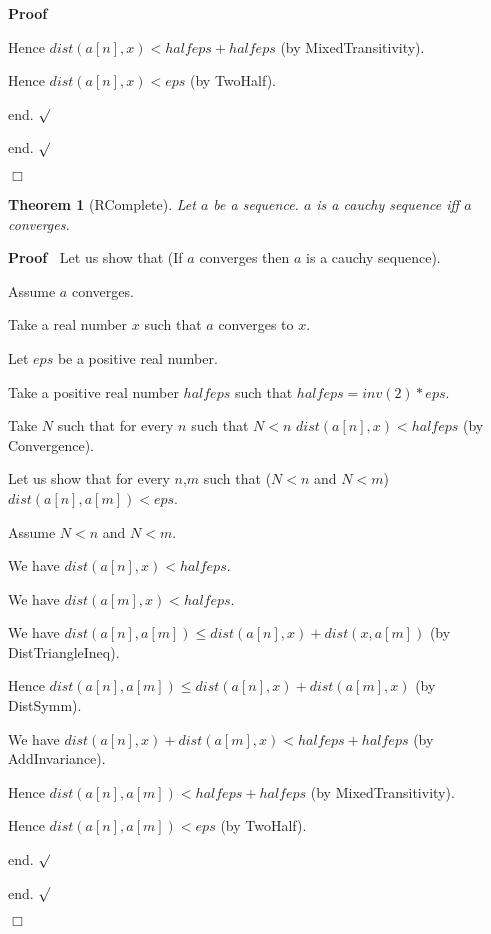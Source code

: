 \documentclass{article}
\newenvironment{forthel}{\begin{leftbar}}{\end{leftbar}}
\newenvironment{proof}{\noindent\textbf{Proof\ }}{\hspace*{\fill}$\Box$\medskip}
\newenvironment{subproof}{\begin{list}{}{}
		\item[\text{Proof}]}{\hfill $\surd$ \end{list}}
\newtheorem{theorem}{Theorem}
\begin{document}
\begin{forthel}
\begin{proof}
\begin{subproof}
\begin{subproof}
				Hence $dist(a[n],x) < halfeps + halfeps$ (by MixedTransitivity).
				
				Hence $dist(a[n],x) < eps$ (by TwoHalf).
				
				end.
			\end{subproof}
			
			end.
		\end{subproof}
	\end{proof}
	
	\begin{theorem}[RComplete]
		Let $a$ be a sequence. $a$ is a cauchy sequence iff $a$ converges.
	\end{theorem}
	
	\begin{proof}
		Let us show that (If $a$ converges then $a$ is a cauchy sequence).
		
		\begin{subproof}
			Assume $a$ converges.
			
			Take a real number $x$ such that $a$ converges to $x$.
			
			Let $eps$ be a positive real number.
			
			Take a positive real number $halfeps$ such that $halfeps = inv(2) * eps$.
			
			Take $N$ such that for every $n$ such that $N < n$ $dist(a[n],x) < halfeps$ (by Convergence).
			
			Let us show that for every $n$,$m$ such that ($N < n$ and $N < m$) $dist(a[n],a[m]) < eps$.
			
			\begin{subproof}
				Assume $N < n$ and $N < m$.
				
				We have $dist(a[n],x) < halfeps$.
				
				We have $dist(a[m],x) < halfeps$.
				
				We have $dist(a[n],a[m]) \leq dist(a[n],x) + dist(x,a[m])$ (by DistTriangleIneq).
				
				Hence $dist(a[n],a[m]) \leq dist(a[n],x) + dist(a[m],x)$ (by DistSymm).
				
				We have $dist(a[n],x) + dist(a[m],x) < halfeps + halfeps$ (by AddInvariance).
				
				Hence $dist(a[n],a[m]) < halfeps + halfeps$ (by MixedTransitivity).
				
				Hence $dist(a[n],a[m]) < eps$ (by TwoHalf).
				
				end.
			\end{subproof}
			
			end.
		\end{subproof}
		

\end{proof}
\end{forthel}
\end{document}
